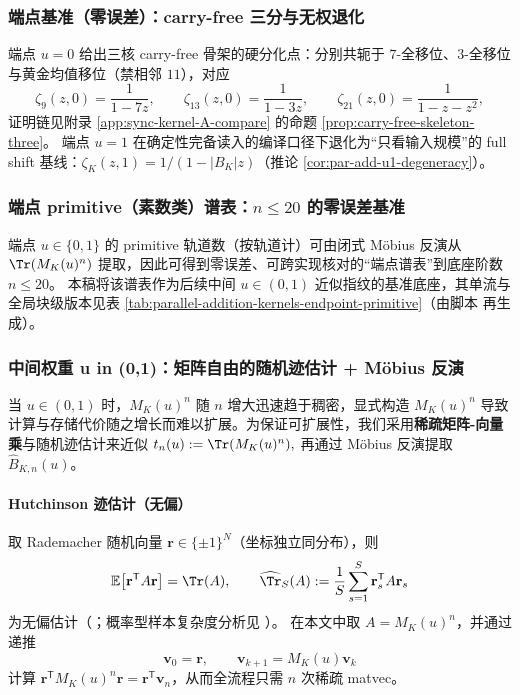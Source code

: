 \subsubsection{端点基准（零误差）：carry-free 三分与无权退化}
端点 $u=0$ 给出三核 carry-free 骨架的硬分化点：分别共轭于 $7$-全移位、$3$-全移位与黄金均值移位（禁相邻 $11$），对应
\[
\zeta_9(z,0)=\frac{1}{1-7z},\qquad
\zeta_{13}(z,0)=\frac{1}{1-3z},\qquad
\zeta_{21}(z,0)=\frac{1}{1-z-z^2},
\]
证明链见附录 \ref{app:sync-kernel-A-compare} 的命题 \ref{prop:carry-free-skeleton-three}。
端点 $u=1$ 在确定性完备读入的编译口径下退化为“只看输入规模”的 full shift 基线：$\zeta_K(z,1)=1/(1-|B_K|z)$（推论 \ref{cor:par-add-u1-degeneracy}）。

\subsubsection{端点 primitive（素数类）谱表：\texorpdfstring{$n\le 20$}{n<=20} 的零误差基准}
端点 $u\in\{0,1\}$ 的 primitive 轨道数（按轨道计）可由闭式 Möbius 反演从 $\Tr(M_K(u)^n)$ 提取，因此可得到零误差、可跨实现核对的“端点谱表”到底座阶数 $n\le 20$。
本稿将该谱表作为后续中间 $u\in(0,1)$ 近似指纹的基准底座，其单流与全局块级版本见表 \ref{tab:parallel-addition-kernels-endpoint-primitive}（由脚本  再生成）。

\subsubsection{中间权重 u in (0,1)：矩阵自由的随机迹估计 + Möbius 反演}
当 $u\in(0,1)$ 时，$M_K(u)^n$ 随 $n$ 增大迅速趋于稠密，显式构造 $M_K(u)^n$ 导致计算与存储代价随之增长而难以扩展。为保证可扩展性，我们采用\textbf{稀疏矩阵-向量乘}与随机迹估计来近似
\(
t_n(u):=\Tr(M_K(u)^n),
\)
再通过 Möbius 反演提取 $\widehat B_{K,n}(u)$。

\paragraph{Hutchinson 迹估计（无偏）}
取 Rademacher 随机向量 $\mathbf r\in\{\pm1\}^N$（坐标独立同分布），则
\[
\mathbb{E}\bigl[\mathbf r^{\mathsf T}A\mathbf r\bigr]=\Tr(A),
\qquad
\widehat{\Tr}_S(A):=\frac{1}{S}\sum_{s=1}^{S}\mathbf r_s^{\mathsf T}A\mathbf r_s
\]
为无偏估计（\cite{Hutchinson1989ASE}；概率型样本复杂度分析见 \cite{AvronToledo2011Trace}）。
在本文中取 $A=M_K(u)^n$，并通过递推
\[
\mathbf v_0=\mathbf r,\qquad \mathbf v_{k+1}=M_K(u)\mathbf v_k
\]
计算 $\mathbf r^{\mathsf T}M_K(u)^n\mathbf r=\mathbf r^{\mathsf T}\mathbf v_n$，从而全流程只需 $n$ 次稀疏 matvec。

